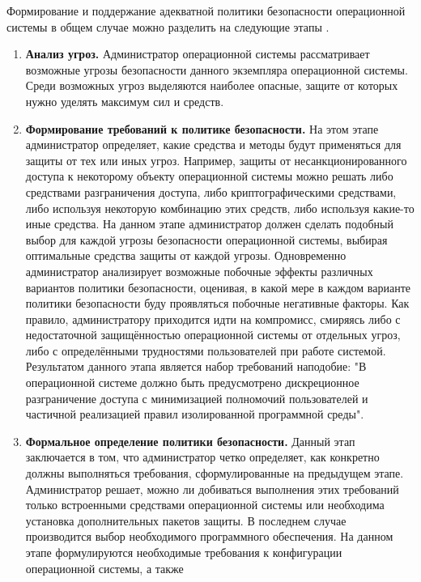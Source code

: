 Формирование и поддержание адекватной политики безопасности операционной системы в общем случае
можно разделить на следующие этапы \cite{os-protection}.
\begin{enumerate}
    \item \textbf{Анализ угроз.} Администратор операционной системы рассматривает возможные угрозы
        безопасности данного экземпляра операционной системы. Среди возможных угроз выделяются
        наиболее опасные, защите от которых нужно уделять максимум сил и средств.
    \item \textbf{Формирование требований к политике безопасности.} На этом этапе администратор
        определяет, какие средства и методы будут применяться для защиты от тех или иных угроз.
        Например, защиты от несанкционированного доступа к некоторому объекту операционной системы
        можно решать либо средствами разграничения доступа, либо криптографическими средствами, либо
        используя некоторую комбинацию этих средств, либо используя какие-то иные средства. На данном
        этапе администратор должен сделать подобный выбор для каждой угрозы безопасности операционной
        системы, выбирая оптимальные средства защиты от каждой угрозы. Одновременно администратор
        анализирует возможные побочные эффекты различных вариантов политики безопасности, оценивая,
        в какой мере в каждом варианте политики безопасности буду проявляться побочные негативные
        факторы. Как правило, администратору приходится идти на компромисс, смиряясь либо с
        недостаточной защищённостью операционной системы от отдельных угроз, либо с определёнными
        трудностями пользователей при работе системой. Результатом данного этапа является набор
        требований наподобие: "В операционной системе должно быть предусмотрено дискреционное
        разграничение доступа с минимизацией полномочий пользователей и частичной реализацией правил
        изолированной программной среды".
    \item \textbf{Формальное определение политики безопасности.} Данный этап заключается в том, что
        администратор четко определяет, как конкретно должны выполняться требования, сформулированные
        на предыдущем этапе. Администратор решает, можно ли добиваться выполнения этих требований
        только встроенными средствами операционной системы или необходима установка дополнительных
        пакетов защиты. В последнем случае производится выбор необходимого программного обеспечения. На
        данном этапе формулируются необходимые требования к конфигурации операционной системы, а также

\end{enumerate}
